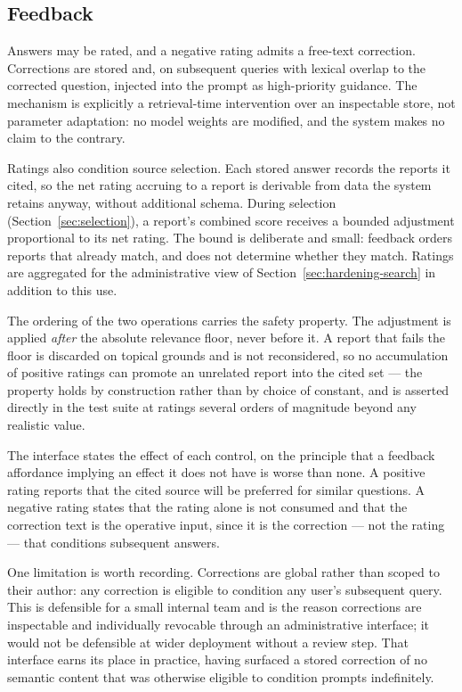\documentclass[12pt, a4paper]{article}
\begin{document}
\subsection{Feedback}
\label{sec:feedback}

Answers may be rated, and a negative rating admits a free-text correction. Corrections are stored and, on subsequent queries with lexical overlap to the corrected question, injected into the prompt as high-priority guidance. The mechanism is explicitly a retrieval-time intervention over an inspectable store, not parameter adaptation: no model weights are modified, and the system makes no claim to the contrary.

Ratings also condition source selection. Each stored answer records the reports it cited, so the net rating accruing to a report is derivable from data the system retains anyway, without additional schema. During selection (Section~\ref{sec:selection}), a report's combined score receives a bounded adjustment proportional to its net rating. The bound is deliberate and small: feedback orders reports that already match, and does not determine whether they match. Ratings are aggregated for the administrative view of Section~\ref{sec:hardening-search} in addition to this use.

The ordering of the two operations carries the safety property. The adjustment is applied \emph{after} the absolute relevance floor, never before it. A report that fails the floor is discarded on topical grounds and is not reconsidered, so no accumulation of positive ratings can promote an unrelated report into the cited set --- the property holds by construction rather than by choice of constant, and is asserted directly in the test suite at ratings several orders of magnitude beyond any realistic value.

The interface states the effect of each control, on the principle that a feedback affordance implying an effect it does not have is worse than none. A positive rating reports that the cited source will be preferred for similar questions. A negative rating states that the rating alone is not consumed and that the correction text is the operative input, since it is the correction --- not the rating --- that conditions subsequent answers.

One limitation is worth recording. Corrections are global rather than scoped to their author: any correction is eligible to condition any user's subsequent query. This is defensible for a small internal team and is the reason corrections are inspectable and individually revocable through an administrative interface; it would not be defensible at wider deployment without a review step. That interface earns its place in practice, having surfaced a stored correction of no semantic content that was otherwise eligible to condition prompts indefinitely.
\end{document}
